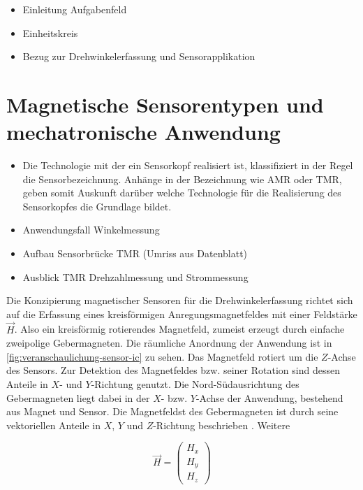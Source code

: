 \begin{itemize}
	\item Einleitung Aufgabenfeld
	\item Einheitskreis
	\item Bezug zur Drehwinkelerfassung und Sensorapplikation
\end{itemize}
\clearpage


\section{Magnetische Sensorentypen und mechatronische Anwendung}\label{sec:magnetische-sensorentypen}
	\begin{itemize}
		\item Die Technologie mit der ein Sensorkopf realisiert ist, klassifiziert in der Regel die Sensorbezeichnung. Anhänge in der Bezeichnung wie AMR oder TMR, geben somit Auskunft darüber welche Technologie für die Realisierung des Sensorkopfes die Grundlage bildet.
		\item Anwendungsfall Winkelmessung
		\item Aufbau Sensorbrücke TMR (Umriss aus Datenblatt)
		\item Ausblick TMR Drehzahlmessung und Strommessung
	\end{itemize}

Die Konzipierung magnetischer Sensoren für die Drehwinkelerfassung richtet sich auf die Erfassung eines kreisförmigen 
Anregungsmagnetfeldes mit einer Feldstärke $\vec{H}$. Also ein kreisförmig rotierendes Magnetfeld, zumeist erzeugt 
durch einfache zweipolige Gebermagneten. Die räumliche Anordnung der Anwendung ist in 
\autoref{fig:veranschaulichung-sensor-ic} zu sehen. Das Magnetfeld rotiert um die $Z$-Achse des Sensors. Zur Detektion 
des Magnetfeldes bzw. seiner Rotation sind dessen Anteile in $X$- und $Y$-Richtung genutzt. Die Nord-Südausrichtung des 
Gebermagneten liegt dabei in der $X$- bzw. $Y$-Achse der Anwendung, bestehend aus Magnet und Sensor. Die Magnetfeldst 
des Gebermagneten ist durch seine vektoriellen Anteile in $X$, $Y$ und $Z$-Richtung beschrieben \cite{Pape2017}. Weitere

\begin{equation}\label{eq:hfeldanteile}
\vec{H} = \begin{pmatrix}H_x\\H_y\\H_z\end{pmatrix}
\end{equation}

